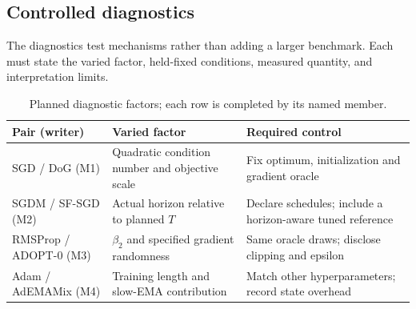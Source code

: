 \subsection{Controlled diagnostics}
The diagnostics test mechanisms rather than adding a larger benchmark. Each must state the
varied factor, held-fixed conditions, measured quantity, and interpretation limits.
\begin{table}[H]\centering\small
\caption{Planned diagnostic factors; each row is completed by its named member.}\label{tab:diagnostic-plan}
\begin{tabularx}{\linewidth}{lXX}\toprule
Pair (writer) & Varied factor & Required control\\\midrule
SGD / DoG (M1) & Quadratic condition number and objective scale & Fix optimum, initialization and gradient oracle\\
SGDM / SF-SGD (M2) & Actual horizon relative to planned $T$ & Declare schedules; include a horizon-aware tuned reference\\
RMSProp / ADOPT-0 (M3) & $\beta_2$ and specified gradient randomness & Same oracle draws; disclose clipping and epsilon\\
Adam / AdEMAMix (M4) & Training length and slow-EMA contribution & Match other hyperparameters; record state overhead\\\bottomrule
\end{tabularx}\end{table}
